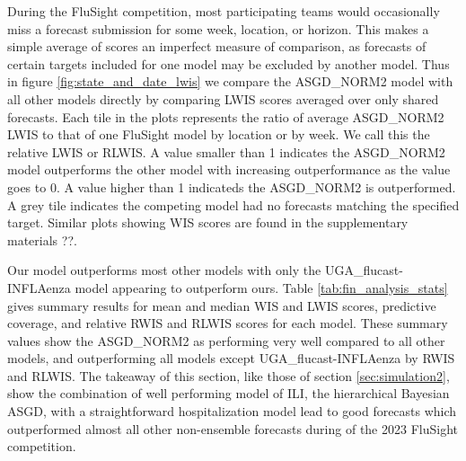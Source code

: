 During the FluSight competition, most participating teams would occasionally 
miss a forecast submission for some week, location, or horizon. This makes a 
simple average of scores an imperfect measure of comparison, as forecasts
of certain targets included for one model may be excluded by another model.
Thus in figure \ref{fig:state_and_date_lwis} 
we compare the ASGD\_NORM2 model with all 
other models directly by comparing LWIS scores averaged over only shared
forecasts. Each tile in the plots represents the ratio of average ASGD\_NORM2
LWIS to that of one FluSight model by location or by week.
We call this the relative LWIS or RLWIS. A value smaller than
1 indicates the ASGD\_NORM2 model outperforms the other model with 
increasing outperformance as the value goes to 0. A value 
higher than 1 indicateds the ASGD\_NORM2 is outperformed. A grey tile indicates
the competing model had no forecasts matching the specified target.
Similar plots showing WIS scores are found in the supplementary materials ??.

Our model outperforms most other models with only the 
UGA\_flucast-INFLAenza model appearing to outperform ours. 
Table \ref{tab:fin_analysis_stats} gives summary results for mean and median
WIS and LWIS scores, predictive coverage, and relative RWIS and RLWIS scores
for each model. These summary values show the ASGD\_NORM2 as performing very
well compared to all other models, and outperforming all models except
UGA\_flucast-INFLAenza by RWIS and RLWIS. 
The takeaway of this section, like those of section \ref{sec:simulation2}, show
the combination of well performing model of ILI, the 
hierarchical Bayesian ASGD, with a 
straightforward hospitalization model lead to good forecasts which 
outperformed almost all other non-ensemble forecasts during of the 2023
FluSight competition.

